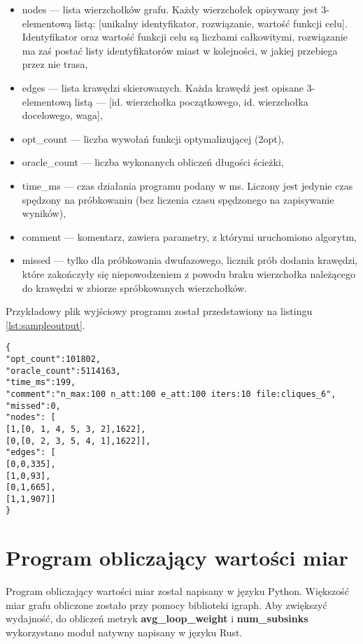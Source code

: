 \begin{itemize}
    \item nodes --- lista wierzchołków grafu. Każdy wierzchołek opisywany jest 3-elementową listą:
          [unikalny identyfikator, rozwiązanie, wartość funkcji celu]. Identyfikator oraz wartość funkcji celu
          są liczbami całkowitymi, rozwiązanie ma zaś postać listy identyfikatorów miast w kolejności, w jakiej przebiega przez nie trasa,
    \item edges --- lista krawędzi skierowanych. Każda krawędź jest opisane 3-elementową listą --- [id. wierzchołka początkowego, id. wierzchołka docelowego, waga],
    \item opt\_count --- liczba wywołań funkcji optymalizującej (2opt),
    \item oracle\_count --- liczba wykonanych obliczeń długości ścieżki,
    \item time\_ms --- czas działania programu podany w ms. Liczony jest jedynie czas spędzony na próbkowaniu
          (bez liczenia czasu spędzonego na zapisywanie wyników),
    \item comment --- komentarz, zawiera parametry, z którymi uruchomiono algorytm,
    \item missed --- tylko dla próbkowania dwufazowego, licznik prób dodania krawędzi, które zakończyły się
          niepowodzeniem z powodu braku wierzchołka należącego do krawędzi w zbiorze spróbkowanych wierzchołków.
\end{itemize}

Przykładowy plik wyjściowy programu został przedstawiony na listingu \ref{lst:sampleoutput}.

\begin{lstlisting}[caption={Przykład pliku wyjściowego po krótkim próbkowaniu małej instancji}, label=lst:sampleoutput]
{
"opt_count":101802,
"oracle_count":5114163,
"time_ms":199,
"comment":"n_max:100 n_att:100 e_att:100 iters:10 file:cliques_6",
"missed":0,
"nodes": [
[1,[0, 1, 4, 5, 3, 2],1622],
[0,[0, 2, 3, 5, 4, 1],1622]],
"edges": [
[0,0,335],
[1,0,93],
[0,1,665],
[1,1,907]]
}
\end{lstlisting}

\section{Program obliczający wartości miar}

Program obliczający wartości miar został napisany w języku Python.
Większość miar grafu obliczone zostało przy pomocy biblioteki igraph.
Aby zwiększyć wydajność, do obliczeń metryk \textbf{avg\_loop\_weight} i \textbf{num\_subsinks}
wykorzystano moduł natywny napisany w języku Rust.


